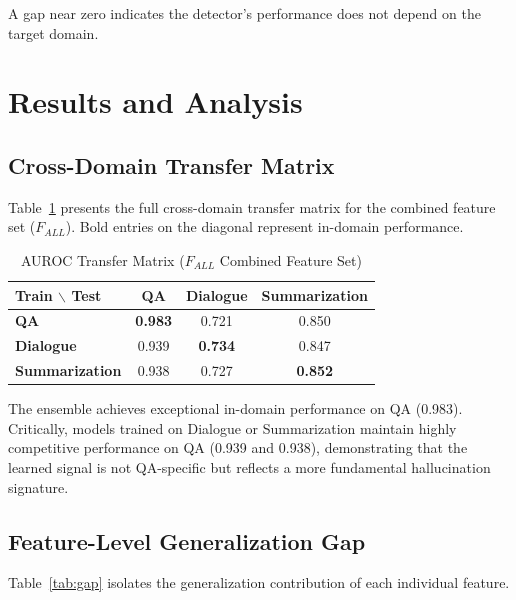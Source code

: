\documentclass[conference]{IEEEtran}
\begin{document}
A gap near zero indicates the detector's performance does not depend on the target domain.

\section{Results and Analysis}

\subsection{Cross-Domain Transfer Matrix}

Table~\ref{tab:transfer} presents the full cross-domain transfer matrix for the combined feature set ($F_{ALL}$). Bold entries on the diagonal represent in-domain performance.

\begin{table}[htbp]
\caption{AUROC Transfer Matrix ($F_{ALL}$ Combined Feature Set)}
\begin{center}
\begin{tabular}{lccc}
\toprule
\textbf{Train $\backslash$ Test} & \textbf{QA} & \textbf{Dialogue} & \textbf{Summarization} \\
\midrule
\textbf{QA}             & \textbf{0.983} & 0.721 & 0.850 \\
\textbf{Dialogue}       & 0.939          & \textbf{0.734} & 0.847 \\
\textbf{Summarization}  & 0.938          & 0.727 & \textbf{0.852} \\
\bottomrule
\end{tabular}
\label{tab:transfer}
\end{center}
\end{table}

The ensemble achieves exceptional in-domain performance on QA (0.983). Critically, models trained on Dialogue or Summarization maintain highly competitive performance on QA (0.939 and 0.938), demonstrating that the learned signal is not QA-specific but reflects a more fundamental hallucination signature.

\subsection{Feature-Level Generalization Gap}

Table~\ref{tab:gap} isolates the generalization contribution of each individual feature.
\end{document}
